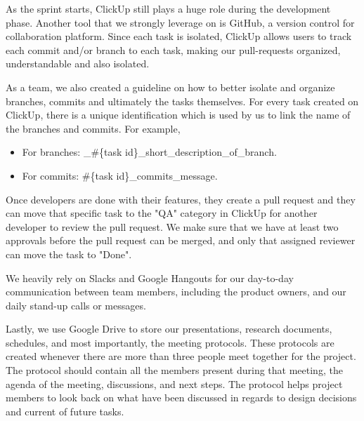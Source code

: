 As the sprint starts, ClickUp still plays a huge role during the development phase. Another tool that we strongly leverage on is GitHub, a version control for collaboration platform. Since each task is isolated, ClickUp allows users to track each commit and/or branch to each task, making our pull-requests organized, understandable and also isolated.

As a team, we also created a guideline on how to better isolate and organize branches, commits and ultimately the tasks themselves. For every task created on ClickUp, there is a unique identification which is used by us to link the name of the branches and commits. For example,

\begin{itemize}
\item For branches: \_\#\{task id\}\_short\_description\_of\_branch.
\item For commits: \#\{task id\}\_commits\_message.
\end{itemize}


Once developers are done with their features, they create a pull request and they can move that specific task to the "QA" category in ClickUp for another developer to review the pull request. We make sure that we have at least two approvals before the pull request can be merged, and only that assigned reviewer can move the task to "Done".

We heavily rely on Slacks and Google Hangouts for our day-to-day communication between team members, including the product owners, and our daily stand-up calls or messages. 

Lastly, we use Google Drive to store our presentations, research documents, schedules, and most importantly, the meeting protocols. These protocols are created whenever there are more than three people meet together for the project. The protocol should contain all the members present during that meeting, the agenda of the meeting, discussions, and next steps. The protocol helps project members to look back on what have been discussed in regards to design decisions and current of future tasks. 


